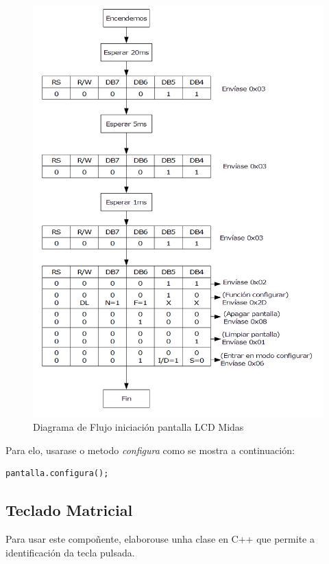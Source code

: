 \documentclass[11pt,twoside]{book}
\begin{document}
\begin{figure}[H]
	\begin{center}
		\includegraphics[scale=0.6]{images/inicializar_lcd.png}
	\end{center}
	\caption{Diagrama de Flujo iniciación pantalla LCD Midas}
	\label{fig:DiagramaFlujoPantalla}
\end{figure}

Para elo, usarase o metodo \textit{configura} como se mostra a continuación:
\begin{verbatim}
pantalla.configura();
\end{verbatim}

\subsection{Teclado Matricial}

Para usar este compoñente, elaborouse unha clase en C++ que permite a identificación da tecla pulsada.
\end{document}
